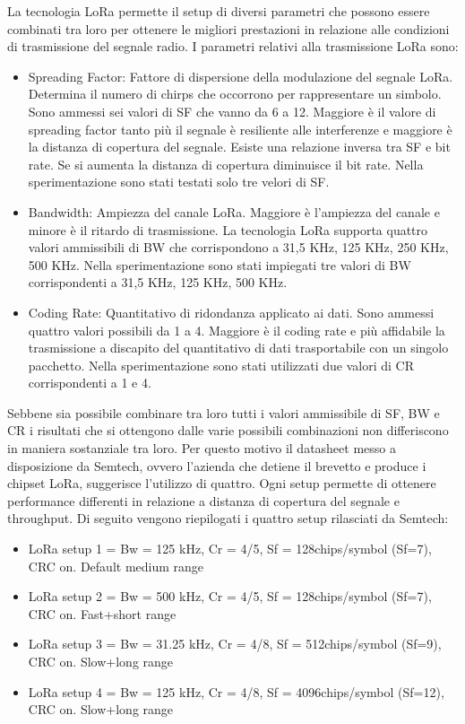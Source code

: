 \documentclass[12pt,a4paper,openright,twoside]{report}
\begin{document}
La tecnologia LoRa permette il setup di diversi parametri che possono essere combinati tra loro per ottenere le migliori prestazioni in relazione alle condizioni di trasmissione del segnale radio. I parametri relativi alla trasmissione LoRa sono:
\begin{itemize}                       
\item Spreading Factor: Fattore di dispersione della modulazione del segnale LoRa. Determina il numero di chirps che occorrono per rappresentare un simbolo. Sono ammessi sei valori di SF che vanno da 6 a 12. Maggiore \`e il valore di spreading factor tanto pi\`u il segnale \`e resiliente alle interferenze e maggiore \`e la distanza di copertura del segnale. Esiste una relazione inversa tra SF e bit rate. Se si aumenta la distanza di copertura diminuisce il bit rate. Nella sperimentazione sono stati testati solo tre velori di SF.
\item Bandwidth: Ampiezza del canale LoRa. Maggiore \`e l'ampiezza del canale e minore \`e il ritardo di trasmissione. La tecnologia LoRa supporta quattro valori ammissibili di BW che corrispondono a 31,5 KHz, 125 KHz, 250 KHz, 500 KHz. Nella sperimentazione sono stati impiegati tre valori di BW corrispondenti a 31,5 KHz, 125 KHz, 500 KHz.
\item Coding Rate: Quantitativo di ridondanza applicato ai dati. Sono ammessi quattro valori possibili da 1 a 4. Maggiore \`e il coding rate e pi\`u affidabile la trasmissione a discapito del quantitativo di dati trasportabile con un singolo pacchetto. Nella sperimentazione sono stati utilizzati due valori di CR corrispondenti a 1 e 4. 
\end{itemize}
Sebbene sia possibile combinare tra loro tutti i valori ammissibile di SF, BW e CR i risultati che si ottengono dalle varie possibili combinazioni non differiscono in maniera sostanziale tra loro.
Per questo motivo il datasheet messo a disposizione da Semtech, ovvero l'azienda che detiene il brevetto e produce i chipset LoRa, suggerisce l'utilizzo di quattro. Ogni setup permette di ottenere performance differenti in relazione a distanza di copertura del segnale e throughput.
Di seguito vengono riepilogati i quattro setup rilasciati da Semtech:
\begin{itemize}                       
\item LoRa setup 1 =  Bw = 125 kHz, Cr = 4/5, Sf = 128chips/symbol (Sf=7), CRC on. Default medium range
\item LoRa setup 2 =  Bw = 500 kHz, Cr = 4/5, Sf = 128chips/symbol (Sf=7), CRC on. Fast+short range
\item LoRa setup 3 =  Bw = 31.25 kHz, Cr = 4/8, Sf = 512chips/symbol (Sf=9), CRC on. Slow+long range
\item LoRa setup 4 = Bw = 125 kHz, Cr = 4/8, Sf = 4096chips/symbol (Sf=12), CRC on. Slow+long range
\end{itemize}
\end{document}
